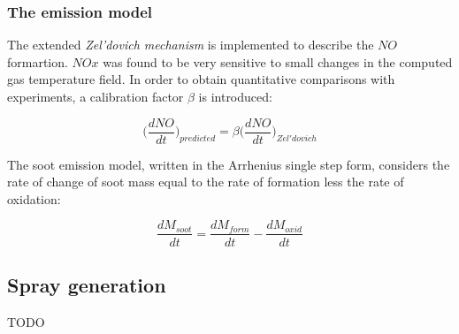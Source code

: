 \documentclass[12pt]{article}
\begin{document}
\subsubsection{The emission model}

The extended \textit{Zel'dovich mechanism} is implemented to describe the $NO$ formartion. $NOx$ was found to be very sensitive to small changes in the computed gas temperature field. In order to obtain quantitative comparisons with experiments, a calibration factor $\beta$ is introduced:

\begin{equation}
    \bigg(\frac{dNO}{dt}\bigg)_{predicted}=\beta \bigg(\frac{dNO}{dt}\bigg)_{Zel'dovich}
\end{equation}

The soot emission model, written in the Arrhenius single step form, considers the rate of change of soot mass equal to the rate of formation less the rate of oxidation:

\begin{equation}
    \frac{dM_{soot}}{dt}= \frac{dM_{form}}{dt}- \frac{dM_{oxid}}{dt}
\end{equation}

\subsection{Spray generation}

TODO
\end{document}
